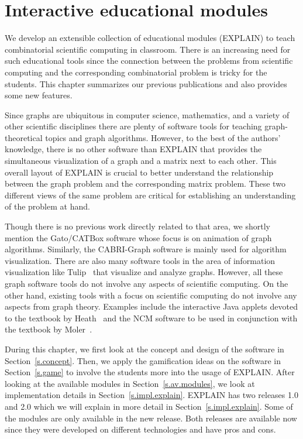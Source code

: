 \documentclass[12pt, twoside,a4paper,toc=bibliography]{scrbook}
\newcommand{\secref}[1]{Section~\protect\ref{#1}}
\begin{document}
\chapter{Interactive educational modules}
\label{explain}
We develop an extensible collection of educational modules (\mbox{EXPLAIN})
to teach combinatorial scientific computing in classroom.
There is an increasing need for such educational tools since the connection
between the problems from scientific computing and the corresponding combinatorial
problem is tricky for the students. This chapter summarizes our previous publications
\cite{2013:05,2014:01,2014:02,2014:09,2015:3} and also provides some new features.

Since graphs are ubiquitous in computer science, mathematics, and a variety of other scientific
disciplines there are plenty of software tools for teaching graph-theoretical topics and graph
algorithms. However, to the best of the authors' knowledge, there is no other software than EXPLAIN
that provides the simultaneous visualization of a graph and a matrix next to each other. This
overall layout of EXPLAIN is crucial to better understand the relationship between the graph
problem and the corresponding matrix problem. These two different views of the same problem are
critical for establishing an understanding of the problem at hand.

Though there is no previous work directly related to that area, we shortly mention the Gato/CATBox
\cite{gato2002} software whose focus is on animation of graph algorithms. Similarly, the
CABRI-Graph \cite{CABRI96} software is mainly used for algorithm visualization. There are also many
software tools in the area of information visualization like
Tulip~\cite{auber:tulip3,tulippython2012} that visualize and analyze graphs. However, all these
graph software tools do not involve any aspects of scientific computing. On the other hand,
existing tools with a focus on scientific computing do not involve any aspects from graph theory.
Examples include the interactive Java applets devoted to the textbook by Heath~\cite{MH96SCAIS} and
the NCM software to be used in conjunction with the textbook by Moler~\cite{mol:num}.

During this chapter, we first look at the concept and design of the software in
\secref{s.concept}. Then, we apply the gamification ideas on the software in
\secref{s.game} to involve the students more into the usage of \mbox{EXPLAIN}.
After looking at the available modules in \secref{s.av.modules}, we look at
implementation details in \secref{s.impl.explain}.
\mbox{EXPLAIN} has two releases 1.0 and 2.0 which we will explain in more
detail in \secref{s.impl.explain}. Some of the modules
are only available in the new release. Both releases
are available now since they were developed on different technologies and have
pros and cons. 
\end{document}
